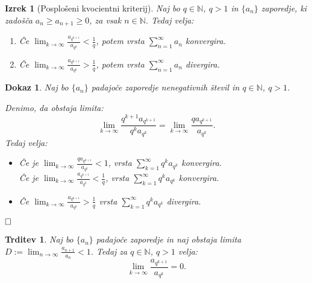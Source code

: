 \documentclass{beamer}
\def\qed{$\hfill\Box$}   %
\newtheorem{izrek}{Izrek}
\newtheorem{trditev}{Trditev}
\newtheorem{dokaz}{Dokaz}
\def\N{\mathbb{N}} %
\begin{document}
\begin{frame}
    \begin{izrek}[Posplošeni kvocientni kriterij]
        Naj bo $q \in \N$, $q > 1$ in $\{a_n\}$ zaporedje,
        ki zadošča $a_{n} \geq a_{n+1} \geq 0$, za vsak $n \in \N$.
        Tedaj velja:
        
        \begin{enumerate}
            \item Če $\lim_{k \to \infty}{\frac{a_{q^{k + 1}}}{a_{q^k}}} < \frac{1}{q}$,
            potem vrsta $\sum_{n = 1}^{\infty}{a_n}$ konvergira.
            \item Če $\lim_{k \to \infty}{\frac{a_{q^{k + 1}}}{a_{q^k}}} > \frac{1}{q}$,
            potem vrsta $\sum_{n = 1}^{\infty}{a_n}$ divergira.
        \end{enumerate}
    \end{izrek}
    
\end{frame}
\begin{frame}
    \begin{dokaz}
        Naj bo $\{a_n\}$ padajoče zaporedje nenegativnih števil in $ q \in {\mathbb{N}}$, $q > 1$.

        Denimo, da obstaja limita:
        \[ 
            \lim_{k \to \infty}{\frac{q^{k + 1}a_{q^{k + 1}}}{q^ka_{q^k}}}  =
            \lim_{k \to \infty}{\frac{qa_{q^{k + 1}}}{a_{q^k}}}  
            \text{.}
        \]
        \pause
        Tedaj velja:
        \begin{itemize}
            \item Če je $\lim_{k \to \infty}{\frac{qa_{q^{k + 1}}}{a_{q^k}}} < 1$, vrsta $\sum_{k = 1}^{\infty}{q^ka_{q^k}}$ konvergira.\\
            Če je $\lim_{k \to \infty}{\frac{a_{q^{k + 1}}}{a_{q^k}}} < \frac{1}{q}$, vrsta $\sum_{k = 1}^{\infty}{q^ka_{q^k}}$ konvergira.
            \item
            Če $\lim_{k \to \infty}{\frac{a_{q^{k + 1}}}{a_{q^k}}} > \frac{1}{q}$
            vrsta $\sum_{k = 1}^{\infty}{q^ka_{q^k}}$ divergira. 
        \end{itemize}
        \qed
    \end{dokaz}
\end{frame}

\begin{frame}
    \begin{trditev}
        Naj bo $\{a_{n}\}$ padajoče zaporedje in naj obstaja limita
        $D := \lim_{n \to \infty}{\frac{a_{n + 1}}{a_n}} < 1$. Tedaj za $q \in {\mathbb{N}}$, $q > 1$ velja:
        \[
            \lim_{k \to \infty}{\frac{a_{q^{k + 1}}}{a_{q^k}}} = 0
            \text{.}
        \]
    \end{trditev}
    
\end{frame}
\end{document}
